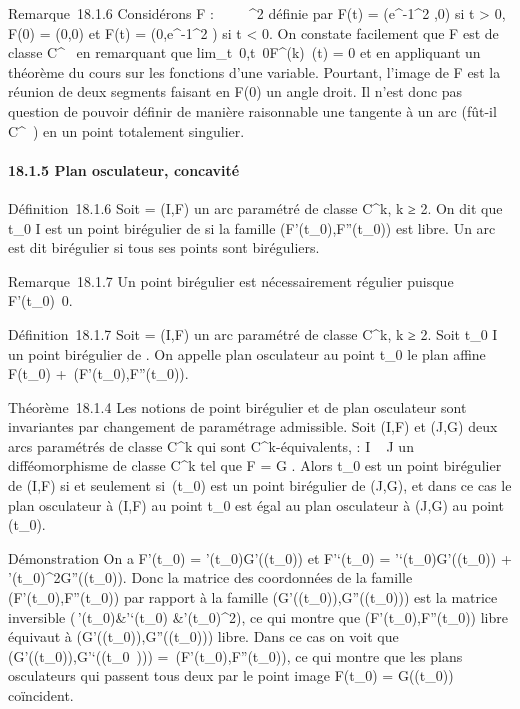 \documentclass[]{article}
\begin{document}
Remarque~18.1.6 Considérons F : ~ \rightarrow~ ~^2 définie par F(t) =
(e^-1\diagupt^2 ,0) si t \textgreater{} 0, F(0) = (0,0)
et F(t) = (0,e^-1\diagupt^2 ) si t \textless{} 0. On
constate facilement que F est de classe C^\infty~ en remarquant que
lim_t\rightarrow~0,t\neq~0F^(k)~(t)
= 0 et en appliquant un théorème du cours sur les fonctions d'une
variable. Pourtant, l'image de F est la réunion de deux segments faisant
en F(0) un angle droit. Il n'est donc pas question de pouvoir définir de
manière raisonnable une tangente à un arc (fût-il C^\infty~) en un
point totalement singulier.

\paragraph{18.1.5 Plan osculateur, concavité}

Définition~18.1.6 Soit \Gamma = (I,F) un arc paramétré de classe
C^k, k ≥ 2. On dit que t_0 \in I est un point
birégulier de \Gamma si la famille (F'(t_0),F''(t_0)) est
libre. Un arc est dit birégulier si tous ses points sont biréguliers.

Remarque~18.1.7 Un point birégulier est nécessairement régulier puisque
F'(t_0)\neq~0.

Définition~18.1.7 Soit \Gamma = (I,F) un arc paramétré de classe
C^k, k ≥ 2. Soit t_0 \in I un point birégulier de \Gamma.
On appelle plan osculateur au point t_0 le plan affine
F(t_0) +\
\mathrmVect(F'(t_0),F''(t_0)).

Théorème~18.1.4 Les notions de point birégulier et de plan osculateur
sont invariantes par changement de paramétrage admissible. Soit (I,F) et
(J,G) deux arcs paramétrés de classe C^k qui sont
C^k-équivalents, \theta : I \rightarrow~ J un difféomorphisme de classe
C^k tel que F = G \cdot \theta. Alors t_0 est un point
birégulier de (I,F) si et seulement si~\theta(t_0) est un point
birégulier de (J,G), et dans ce cas le plan osculateur à (I,F) au point
t_0 est égal au plan osculateur à (J,G) au point
\theta(t_0).

Démonstration On a F'(t_0) =
\theta'(t_0)G'(\theta(t_0)) et F'`(t_0) =
\theta'`(t_0)G'(\theta(t_0)) +
\theta'(t_0)^2G''(\theta(t_0)). Donc la matrice des
coordonnées de la famille (F'(t_0),F''(t_0)) par
rapport à la famille (G'(\theta(t_0)),G''(\theta(t_0))) est la
matrice inversible \left
(\matrix\,\theta'(t_0)&\theta'`(t_0)
&\theta'(t_0)^2\right ), ce qui montre
que (F'(t_0),F''(t_0)) libre équivaut à
(G'(\theta(t_0)),G''(\theta(t_0))) libre. Dans ce cas on voit
que
\mathrmVect(G'(\theta(t_0)),G'`(\theta(t_0~)))
=\
\mathrmVect(F'(t_0),F''(t_0)), ce
qui montre que les plans osculateurs qui passent tous deux par le point
image F(t_0) = G(\theta(t_0)) coïncident.
\end{document}
